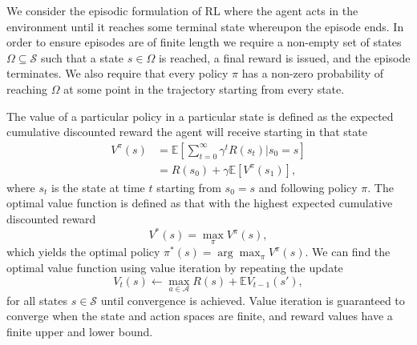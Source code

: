 We consider the episodic formulation of RL where the agent acts in the environment until it reaches some terminal state whereupon the episode ends.
In order to ensure episodes are of finite length we require a non-empty set of states $\Omega \subseteq \mathcal{S}$ such that a state $s \in \Omega$ is reached, a final reward is issued, and the episode terminates.
We also require that every policy $\pi$ has a non-zero probability of reaching $\Omega$ at some point in the trajectory starting from every state.


The value of a particular policy in a particular state is defined as the  expected cumulative discounted reward the agent will receive starting in that state
\begin{align*}
        V^\pi(s) &= \mathbb{E} [ \sum_{t=0}^\infty \gamma^t R(s_t)|s_0=s] \\
        &= R(s_0) + \gamma \mathbb{E} [V^\pi(s_1)],
\end{align*}
where $s_t$ is the state at time $t$ starting from $s_0=s$ and following policy $\pi$. The optimal value function is defined as that with the highest expected cumulative discounted reward 
\begin{equation*}
    V^*(s) = \max_\pi V^\pi(s),
\end{equation*}
which yields the optimal policy $\pi^*(s) = \arg \max_\pi V^\pi(s)$. 
We can find the optimal value function using value iteration by repeating the update
\begin{equation*}
    V_t(s) \leftarrow \max_{a \in \mathcal{A}} R(s) + \mathbb{E} V_{t-1}(s'),
\end{equation*}
for all states $s \in \mathcal{S}$ until convergence is achieved.
Value iteration is guaranteed to converge when the state and action spaces are finite, and reward values have a finite upper and lower bound.

